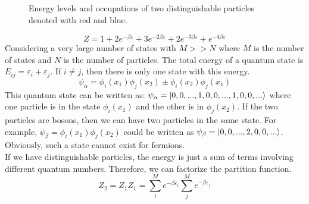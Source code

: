 \begin{figure}[h!]
{
        }
        \caption{Energy levels and occupations of two distinguishable particles denoted with red and blue.}
        \label{fig:distinctenergies}
    \end{figure}
    \begin{equation}
        Z = 1 + 2e^{-\beta\varepsilon} + 3e^{-2\beta\varepsilon} + 2e^{-3\beta\varepsilon} + e^{-4\beta\varepsilon}
    \end{equation}
    Considering a very large number of states with $M>>N$ where $M$ is the number of states and $N$ is the number of particles. The total energy of a quantum state is $E_{ij}=\varepsilon_i+\varepsilon_j$. If $i\neq j$, then there is only one state with this energy. 
    \begin{equation}
        \psi_\alpha = \phi_i(x_1)\phi_j(x_2) \pm \phi_i(x_2)\phi_j(x_1)
    \end{equation}
    This quantum state can be written as: $ \psi_\alpha = \left| 0,0,...,1,0,0,...,1,0,0,... \right>$ where one particle is in the state $\phi_i(x_1)$ and the other is in $\phi_j(x_2)$. If the two particles are bosons, then we can have two particles in the same state. For example, $\psi_\beta = \phi_i(x_1)\phi_j(x_2)$ could be written as $\psi_\beta = \left| 0,0,...,2,0,0,... \right>$. Obviously, such a state cannot exist for fermions.\\ 
    If we have distinguishable particles, the energy is just a sum of terms involving different quantum numbers. Therefore, we can factorize the partition function. 
    \begin{equation}
        Z_2 = Z_1Z_1 = \sum_i^Me^{-\beta\varepsilon_i}\sum_j^Me^{-\beta\varepsilon_j}
    \end{equation}
